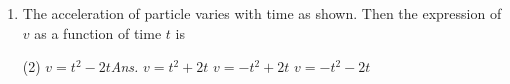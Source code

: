 \documentclass{article}
\newcommand{\ans}{\textcolor{red!95}{\textit{\quad Ans.}}}
\begin{document}
\begin{enumerate}
\item The acceleration of particle varies with time as shown. Then the expression of $v$ as a function of time $t$ is
\begin{center}
\end{center}
\begin{tasks}(2)
	\task $v=t^2-2t$\ans
	\task $v=t^2+2t$
	\task $v=-t^2+2t$
	\task $v=-t^2-2t$
\end{tasks}
            
	
\end{enumerate}
\end{document}
